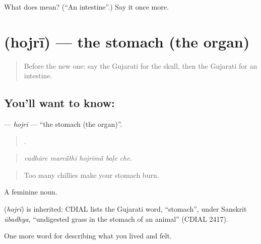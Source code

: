 \begin{tcolorbox}[breakable,colback=teal!4,colframe=teal!35!black,title={Before you move on}]
What does  mean? (\textquotedblleft{}An intestine\textquotedblright{}.) Say it once more.
\end{tcolorbox}
\section[\texorpdfstring{\gu{હોજરી} (hojrī)}{હોજરી (hojrī)}]{ (hojrī) — the stomach (the organ)}

\label{lesson:GU-C472-hojri}



\begin{quote}
Before the new one: say the Gujarati for the skull, then the Gujarati for an intestine.
\end{quote}

\subsection*{You'll want to know: }
\textbf{} — \emph{hojrī} — \textquotedblleft{}the stomach (the organ)\textquotedblright{}.

\begin{quote}
    .
\end{quote}

\begin{quote}
\emph{vadhāre marcā̃thī hojrīmā̃ baḷe che.}
\end{quote}

\begin{quote}
Too many chillies make your stomach burn.
\end{quote}

A feminine noun.

\begin{cousinweb}
\textbf{} (\emph{hojrī}) is inherited: CDIAL lists the Gujarati word, \textquotedblleft{}stomach\textquotedblright{}, under Sanskrit \emph{ūbadhya}, \textquotedblleft{}undigested grass in the stomach of an animal\textquotedblright{} (CDIAL 2417).
\end{cousinweb}

\begin{grammarlens}[title={What you've built}]
One more word for describing what you lived and felt.
\end{grammarlens}

